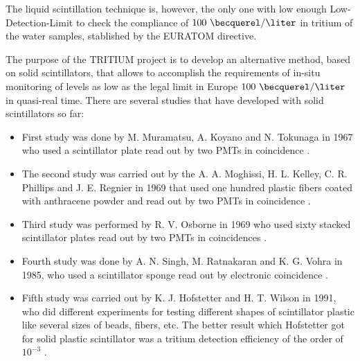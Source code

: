 The liquid scintillation technique is, however, the only one with low enough Low-Detection-Limit to check the compliance of $100~\becquerel/\liter$ in tritium of the water samples, stablished by the EURATOM directive. 

The purpose of the TRITIUM project is to develop an alternative method, based on solid scintillators, that allows to accomplish the requirements of in-situ monitoring of levels as low as the legal limit in Europe $100~\becquerel/\liter$ in quasi-real time. There are several studies that have developed with solid scintillators so far:

\begin{itemize}

\item{} First study was done by M. Muramatsu, A. Koyano and N. Tokunaga in 1967 who used a scintillator plate read out by two PMTs in coincidence \cite{Muramatsu}.

\item{} The second study was carried out by the A. A. Moghissi, H. L. Kelley, C. R. Phillips and J. E. Regnier in 1969 that used one hundred plastic fibers coated with anthracene powder and read out by two PMTs in coincidence \cite{Moghissi}.

\item{} Third study was performed by R. V. Osborne in 1969 who used sixty stacked scintillator plates read out by two PMTs in coincidences \cite{Osborne}.

\item{} Fourth study was done by A. N. Singh, M. Ratnakaran and K. G. Vohra in 1985, who used a scintillator sponge read out by electronic coincidence \cite{Ratnakaran, Ratnakaran2000}.

\item{} Fifth study was carried out by K. J. Hofstetter and H. T. Wilson in 1991, who did different experiments for testing different shapes of scintillator plastic like several sizes of beads, fibers, etc. The better result which Hofstetter got for solid plastic scintillator was a tritium detection efficiency of the order of $10^{-3}$ \cite{Hofstetter1, Hofstetter2}.

\end{itemize}

